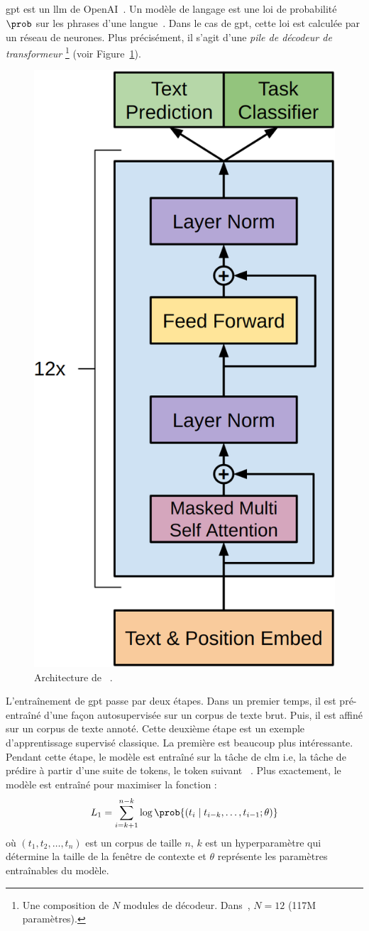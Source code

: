 \subsection{}

\Gls{gpt} est un \gls{llm} de OpenAI~\cite{Radford_Narasimhan_Salimans_Sutskever}.
Un modèle de langage est une loi de probabilité \(\prob\) sur les phrases d'une langue~\cite{routledge}.
Dans le cas de \gls{gpt}, cette loi est calculée par un réseau de neurones.
Plus précisément, il s'agit d'une \emph{pile de décodeur de transformeur}%
\footnote{%
    Une composition de \(N\) modules de décodeur. 
    Dans~\cite{Radford_Narasimhan_Salimans_Sutskever}, \(N=12\)
    (117M paramètres).
} (voir Figure~\ref{fig.gpt}).

\begin{figure}[hbt]
    \centering
    \includegraphics[height=.5\linewidth]{assets/images/gpt.png}
    \caption[Architecture de \gls{gpt}.]%
    {Architecture de ~\cite{Radford_Narasimhan_Salimans_Sutskever}.}
    \label{fig.gpt}
\end{figure}

L'entraînement de \gls{gpt} passe par deux étapes.
Dans un premier temps, il est pré-entraîné d'une façon autosupervisée sur un corpus de texte brut.
Puis, il est affiné sur un corpus de texte annoté.
Cette deuxième étape est un exemple d'apprentissage supervisé classique.
La première est beaucoup plus intéressante.
Pendant cette étape, le modèle est entraîné sur la tâche de \gls{clm}
i.e, la tâche de prédire à partir d'une suite de tokens, le token suivant%
~\cite{Radford_Narasimhan_Salimans_Sutskever}.
Plus exactement, le modèle est entraîné pour maximiser la fonction :
\begin{equation}
    \label{eq.gpt-pretrain-loss}
    L_1=\sum_{i=k+1}^{n-k} \log\prob{\left(t_i \mid t_{i-k}, \ldots, t_{i-1} ; \theta\right)}
\end{equation}
où \(\left(t_1, t_2, \ldots, t_n\right)\) est un corpus de taille \(n\), 
\(k\) est un hyperparamètre qui détermine la taille de la fenêtre de contexte
et \(\theta\) représente les paramètres entraînables du modèle.

